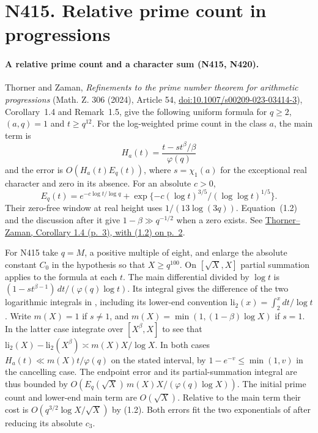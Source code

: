\section*{N415. Relative prime count in progressions}

\paragraph{A relative prime count and a character sum (N415, N420).}\label{r5:lit:N415}
Thorner and Zaman, \emph{Refinements to the prime number theorem for
arithmetic progressions} (Math. Z. 306 (2024), Article 54, \href{https://doi.org/10.1007/s00209-023-03414-3}{doi:10.1007/s00209-023-03414-3}), Corollary~1.4 and Remark~1.5, give the following
uniform formula for $q\ge2$, $(a,q)=1$ and $t\ge q^{12}$.
For the log-weighted prime count in the class $a$, the main term is
\[
 H_a(t)=\frac{t-s t^\beta/\beta}{\varphi(q)}
\]
and the error is $O(H_a(t)E_q(t))$, where $s=\chi_1(a)$ for the
exceptional real character and zero in its absence. For an absolute
$c>0$,
\[
 E_q(t)=e^{-c\log t/\log q}
       +\exp\{-c(\log t)^{3/5}/(\log\log t)^{1/5}\}.
\]
Their zero-free window at real height uses $1/(13\log(3q))$.
Equation~(1.2) and the discussion after it give
$1-\beta\gg q^{-1/2}$ when a zero exists.
See \href{https://arxiv.org/pdf/2108.10878\#page=3}{Thorner--Zaman,
Corollary 1.4 (p.~3), with (1.2) on p.~2}.

For N415 take $q=M$, a positive multiple of eight, and enlarge the
absolute constant $C_0$ in the hypothesis so that $X\ge q^{100}$.
On $[\sqrt X,X]$ partial summation applies to the formula at each $t$.
The main differential divided by $\log t$ is
$(1-s t^{\beta-1})\,dt/(\varphi(q)\log t)$.
Its integral gives the difference of the two logarithmic integrals in
, including its lower-end convention
$\mathrm{li}_2(x)=\int_2^x dt/\log t$.
Write $m(X)=1$ if $s\ne1$, and
$m(X)=\min(1,(1-\beta)\log X)$ if $s=1$. In the latter case integrate
over $[X^\beta,X]$ to see that $\mathrm{li}_2(X)-\mathrm{li}_2(X^\beta)
\asymp m(X)X/\log X$. In both cases $H_a(t)\ll m(X)t/\varphi(q)$ on
the stated interval, by $1-e^{-v}\le\min(1,v)$ in the cancelling case.
The endpoint error and its partial-summation integral are thus bounded by
$O(E_q(\sqrt X)\,m(X)X/(\varphi(q)\log X))$.
The initial prime count and lower-end main term are $O(\sqrt X)$.
Relative to the main term their cost is
$O(q^{3/2}\log X/\sqrt X)$ by (1.2). Both errors fit the two
exponentials of  after reducing its absolute $c_3$.

